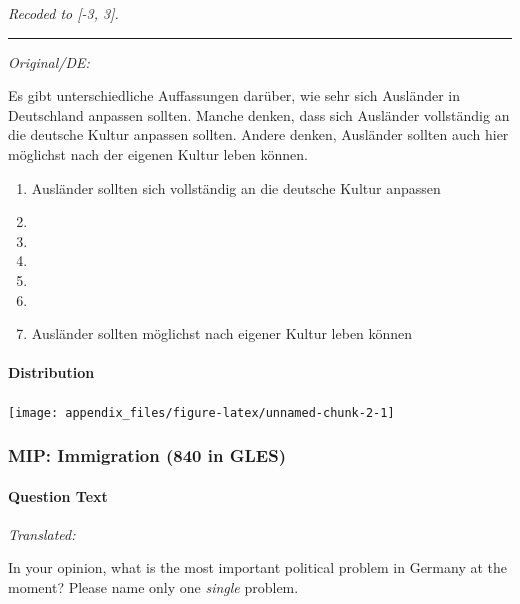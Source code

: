 \documentclass[
]{article}
\providecommand{\tightlist}{%
  \setlength{\itemsep}{0pt}\setlength{\parskip}{0pt}}
\begin{document}
\emph{Recoded to {[}-3, 3{]}.}

\begin{center}\rule{0.5\linewidth}{0.5pt}\end{center}

\emph{Original/DE:}

Es gibt unterschiedliche Auffassungen darüber, wie sehr sich Ausländer in Deutschland anpassen sollten. Manche denken, dass sich Ausländer vollständig an die deutsche Kultur anpassen sollten. Andere denken, Ausländer sollten auch hier möglichst nach der eigenen Kultur leben können.

\begin{enumerate}
\def\labelenumi{(\arabic{enumi})}
\tightlist
\item
  Ausländer sollten sich vollständig an die deutsche Kultur anpassen
\item
\item
\item
\item
\item
\item
  Ausländer sollten möglichst nach eigener Kultur leben können
\end{enumerate}

\hypertarget{distribution-1}{%
\paragraph{Distribution}\label{distribution-1}}

\begin{center}\texttt{[image: appendix\_files/figure-latex/unnamed-chunk-2-1]} \end{center}

\hypertarget{mip-immigration-840-in-gles}{%
\subsubsection{MIP: Immigration (840 in GLES)}\label{mip-immigration-840-in-gles}}

\hypertarget{question-text-2}{%
\paragraph{Question Text}\label{question-text-2}}

\emph{Translated:}

In your opinion, what is the most important political problem in Germany at the moment?
Please name only one \emph{single} problem.
\end{document}
